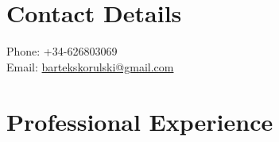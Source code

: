 \documentclass{article}
\begin{document}
\pagestyle{empty}

\begin{center}
\end{center}
\vspace{-0.7cm}
\section{Contact Details}

\begin{flushleft}
Phone: +34-626803069\\
Email: \href{mailto:bartekskorulski@gmail.com}{bartekskorulski@gmail.com}
\end{flushleft}

\section{Professional Experience}
\end{document}
